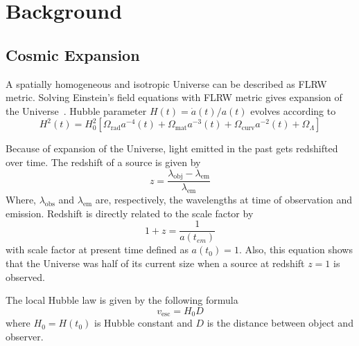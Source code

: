 \section[Background]{Background}
\subsection{Cosmic Expansion}
A spatially homogeneous and isotropic Universe can be described as FLRW metric. Solving Einstein's field equations with FLRW metric gives expansion of the Universe~\cite{TEU}. Hubble parameter $H(t)=\dot{a}(t)/a(t)$ evolves according to~\cite{manual}
\begin{equation}
H^2(t) = H_0^2 \left[ \Omega_\text{rad} a^{-4}(t) + \Omega_\text{mat}a^{-3}(t) + \Omega_\text{curv}a^{-2} (t) + \Omega_\Lambda \right]
\end{equation}

Because of expansion of the Universe, light emitted in the past gets redshifted over time. The redshift of a source is given by~\cite{manual}
\begin{equation}
z=\frac{\lambda_\text{obj}-\lambda_\text{em}}{\lambda_\text{em}}
\label{math:z}
\end{equation}
\noindent
Where, $\lambda_\text{obs}$ and $\lambda_\text{em}$ are, respectively, the wavelengths at time of observation and emission.
Redshift is directly related to the scale factor by~\cite{manual}
\begin{equation}
1+z=\frac{1}{a(t_{em})}
\end{equation}
with scale factor at present time defined as $a(t_0) = 1$. Also, this equation shows that the Universe was half of its current size when a source at redshift $z= 1$ is observed.

The local Hubble law is given by the following formula~\cite{manual}
 \begin{equation}
    v_\text{esc}=H_{0}D
 \label{Hubble}
 \end{equation}
 where $H_{0} = H(t_0)$ is Hubble constant and $D$ is the distance between object and observer.
  
